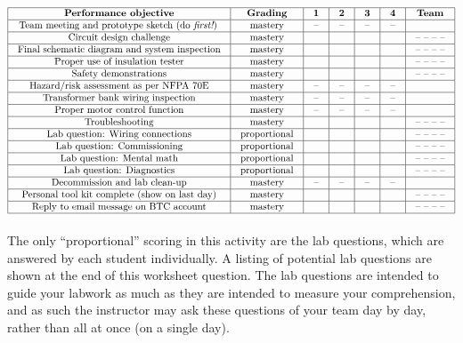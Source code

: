 $$\vbox{\offinterlineskip
\halign{\strut
\vrule \quad\hfil # \ \hfil & 
\vrule \quad\hfil # \ \hfil & 
\vrule \quad\hfil # \ \hfil & 
\vrule \quad\hfil # \ \hfil & 
\vrule \quad\hfil # \ \hfil & 
\vrule \quad\hfil # \ \hfil & 
\vrule \quad\hfil # \ \hfil \vrule \cr
\noalign{\hrule}
%
{\bf Performance objective} & {\bf Grading} & {\bf 1} & {\bf 2} & {\bf 3} & {\bf 4} & {\bf Team} \cr
%
\noalign{\hrule}
%
Team meeting and prototype sketch (do {\it first!}) & mastery & -- & -- & -- & -- & \cr
%
\noalign{\hrule}
%
Circuit design challenge & mastery & & & & & -- -- -- -- \cr
%
\noalign{\hrule}
%
Final schematic diagram and system inspection & mastery & & & & & -- -- -- -- \cr
%
\noalign{\hrule}
%
Proper use of insulation tester & mastery & & & & & -- -- -- -- \cr
%
\noalign{\hrule}
%
Safety demonstrations & mastery & & & & & -- -- -- -- \cr
%
\noalign{\hrule}
%
Hazard/risk assessment as per NFPA 70E & mastery & -- & -- & -- & -- &  \cr
%
\noalign{\hrule}
%
Transformer bank wiring inspection & mastery & -- & -- & -- & -- &  \cr
%
\noalign{\hrule}
%
Proper motor control function & mastery & -- & -- & -- & -- &  \cr
%
\noalign{\hrule}
%
Troubleshooting & mastery & & & & & -- -- -- -- \cr
%
\noalign{\hrule}
%
Lab question: Wiring connections & proportional &  &  &  &  & -- -- -- -- \cr
%
\noalign{\hrule}
%
Lab question: Commissioning & proportional &  &  &  &  & -- -- -- -- \cr
%
\noalign{\hrule}
%
Lab question: Mental math & proportional &  &  &  &  & -- -- -- -- \cr
%
\noalign{\hrule}
%
Lab question: Diagnostics & proportional &  &  &  &  & -- -- -- -- \cr
%
\noalign{\hrule}
%
Decommission and lab clean-up & mastery & -- & -- & -- & -- &  \cr
%
\noalign{\hrule}
%
Personal tool kit complete (show on last day) & mastery &  &  &  &  & -- -- -- -- \cr
%
\noalign{\hrule}
%
Reply to email message on BTC account & mastery &  &  &  &  & -- -- -- -- \cr
%
\noalign{\hrule}
} %
}$$ %

The only ``proportional'' scoring in this activity are the lab questions, which are answered by each student individually.  A listing of potential lab questions are shown at the end of this worksheet question.  The lab questions are intended to guide your labwork as much as they are intended to measure your comprehension, and as such the instructor may ask these questions of your team day by day, rather than all at once (on a single day).

